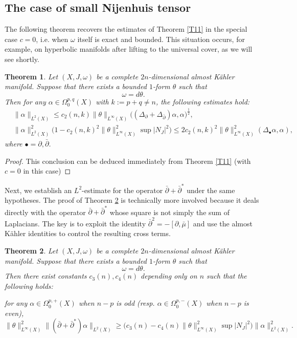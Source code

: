 \documentclass[12pt, twoside]{article}
\newtheorem{theorem}{Theorem}[section]
\theoremstyle{definition}
\numberwithin{equation}{section}
\def \a {\alpha }
\def \De {\Delta}
\def\w {\omega}
\def\Om{\Omega}
\def\pa{\partial}
\begin{document}
	\subsection{The case of small Nijenhuis tensor}
	The following theorem recovers the estimates of Theorem \ref{T11} in the special case $c=0$, i.e. when $\w$ itself is exact and bounded. This situation occurs, for example, on hyperbolic manifolds after lifting to the universal cover, as we will see shortly.
	\begin{theorem}\label{Thm6}
	Let $(X,J,\w)$ be a complete $2n$-dimensional almost K\"{a}hler manifold. Suppose that there exists a bounded $1$-form $\theta$ such that
	\[\w=d\theta.\]
	Then for any $\a\in\Om^{p,q}_{0}(X)$ with $k:=p+q\neq n$, the following estimates hold:
	\begin{equation*}
	\begin{split}
	&\|\a\|_{L^{2}(X)}\leq c_2(n,k)\|\theta\|_{L^{\infty}(X)}\Big((\De_{\pa}+\De_{\bar{\pa}})\a,\a\Big)^{\frac{1}{2}},\\
	&\|\a\|_{L^{2}(X)}^{2}\Big(1-c_2(n,k)^{2}\|\theta\|^{2}_{L^{\infty}(X)}\sup|N_{J}|^{2}\Big)
	\leq 2c_2(n,k)^{2}\|\theta\|^{2}_{L^{\infty}(X)}(\De_{\bullet}\a,\a),
	\end{split}
	\end{equation*}
	where $\bullet=\pa,\bar{\pa}$. 
\end{theorem}	
	\begin{proof}
	This conclusion can be deduced immediately from Theorem \ref{T11} (with $c=0$ in this case)
	\end{proof}
	Next, we establish an $L^{2}$-estimate for the operator $\bar{\partial} + \bar{\partial}^{*}$ under the same hypotheses. The proof of Theorem \ref{Thm3} is technically more involved because it deals directly with the operator $\bar{\partial}+\bar{\partial}^{\ast}$ whose square is not simply the sum of Laplacians. The key is to exploit the identity $\bar{\pa}^{2}=-[\pa,\bar{\mu}]$ and use the almost Kähler identities to control the resulting cross terms.
\begin{theorem}\label{Thm3}
	Let $(X,J,\w)$ be a complete $2n$-dimensional almost K\"{a}hler manifold. Suppose that there exists a bounded $1$-form $\theta$ such that
	\[ \w=d\theta.\]
	Then there exist constants $c_{3}(n),c_{4}(n)$ depending only on $n$ such that the following holds: 
	
	for any $\a\in\Om_{0}^{p,+}(X)$ when $n-p$ is odd (resp. $\a\in\Om_{0}^{p,-}(X)$ when $n-p$ is even), 
	\[\|\theta\|^{2}_{L^{\infty}(X)}\|(\bar{\partial}+\bar{\partial}^{\ast})\a\|_{L^{2}(X)}
	\geq \Big(c_{3}(n)-c_{4}(n)\|\theta\|^{2}_{L^{\infty}(X)}\sup|N_{J}|^{2}\Big)\|\a\|^{2}_{L^{2}(X)}. \]
\end{theorem}
\end{document}
